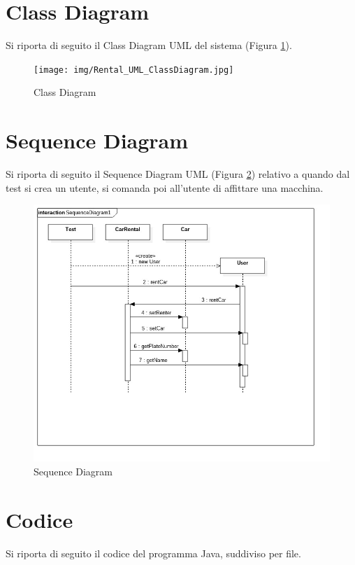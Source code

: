 \documentclass[]{article}
\begin{document}
\clearpage
\section*{Class Diagram}
Si riporta di seguito il Class Diagram UML del sistema (Figura \ref{imgClassDiagram}).

\begin{figure}[H]
	\texttt{[image: img/Rental\_UML\_ClassDiagram.jpg]}
	\caption{Class Diagram}
	\label{imgClassDiagram}
\end{figure}

\clearpage
\section*{Sequence Diagram}
Si riporta di seguito il Sequence Diagram UML (Figura \ref{imgSequenceDiagram}) relativo a quando dal test si crea un utente, si comanda poi all'utente di affittare una macchina.

\begin{figure}[H]
	\includegraphics[width=\linewidth]{img/Rental_UML_SequenceDiagram.jpg}
	\caption{Sequence Diagram}
	\label{imgSequenceDiagram}
\end{figure}

\clearpage
\section*{Codice}
Si riporta di seguito il codice del programma Java, suddiviso per file.
\end{document}

